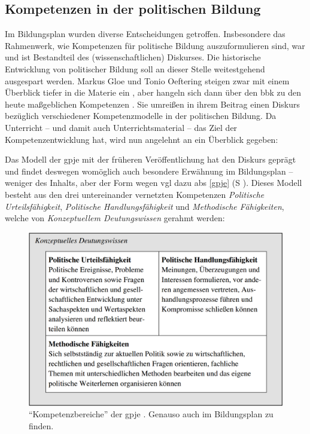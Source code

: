 \subsection{Kompetenzen in der politischen Bildung}
Im Bildungsplan wurden diverse Entscheidungen getroffen. Insbesondere das Rahmenwerk, wie Kompetenzen für politische Bildung auszuformulieren sind, war und ist Bestandteil des (wissenschaftlichen) Diskurses. Die historische Entwicklung von politischer Bildung soll an dieser Stelle weitestgehend ausgespart werden. 
Markus Gloe und Tonio Oeftering steigen zwar mit einem Überblick tiefer in die Materie ein \autocite[95-100]{Gloe2020}, aber hangeln sich dann über den \gls{bbk} \autocite[101-103; in dieser Arbeit \gls{s} \gls{abs} \ref{bbk}: \gls{S} \pageref{bbk}]{Gloe2020} zu den heute maßgeblichen Kompetenzen \autocite[104-114]{Gloe2020}. Sie umreißen in ihrem Beitrag einen Diskurs bezüglich verschiedener Kompetenzmodelle in der politischen Bildung. Da Unterricht -- und damit auch Unterrichtsmaterial -- das Ziel der Kompetenzentwicklung hat, wird nun angelehnt an \citeauthor{Gloe2020} ein Überblick gegeben:

Das Modell der \gls{gpje} mit der früheren Veröffentlichung \citeyear{gpje2004} hat den Diskurs geprägt und findet deswegen womöglich auch besondere Erwähnung im Bildungsplan -- weniger des Inhalts, aber der Form wegen \gls{vgl} dazu \gls{abs} \ref{gpje} (\gls{S} \pageref{gpje}).
Dieses Modell besteht aus den drei untereinander vernetzten Kompetenzen \emph{Politische Urteilsfähigkeit}, \emph{Politische Handlungsfähigkeit} und \emph{Methodische Fähigkeiten}, welche von \emph{Konzeptuellem Deutungswissen} gerahmt werden:
\begin{figure}[H]
    \centering
    \includegraphics[width=1\linewidth]{gpje 2004 Kompetenzmodell S. 13.png}
    \caption{\enquote{Kompetenzbereiche} der \gls{gpje} \autocite[13]{gpje2004}. Genauso auch im Bildungsplan \autocite[10]{bplan} zu finden.}
    \label{gpjeKompetenzmodell}
\end{figure}

